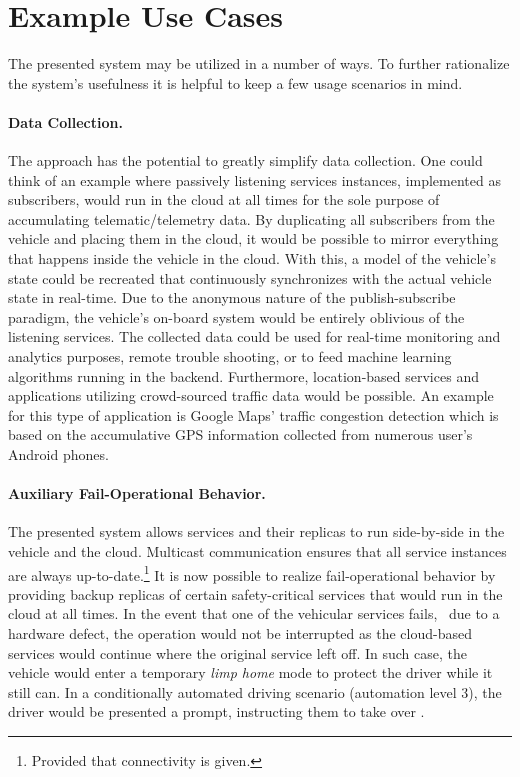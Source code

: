 \section{Example Use Cases} \label{sec:usecases}
The presented system may be utilized in a number of ways. To further rationalize the system's usefulness it is helpful to keep a few usage scenarios in mind.

\paragraph{Data Collection.}
The approach has the potential to greatly simplify data collection. One could think of an example where passively listening services instances, implemented as subscribers, would run in the cloud at all times for the sole purpose of accumulating telematic/telemetry data. By duplicating all subscribers from the vehicle and placing them in the cloud, it would be possible to mirror everything that happens inside the vehicle in the cloud. With this, a model of the vehicle's state could be recreated that continuously synchronizes with the actual vehicle state in real-time. Due to the anonymous nature of the publish-subscribe paradigm, the vehicle's on-board system would be entirely oblivious of the listening services. The collected data could be used for real-time monitoring and analytics purposes, remote trouble shooting, or to feed machine learning algorithms running in the backend. Furthermore, location-based services and applications utilizing crowd-sourced traffic data would be possible. An example for this type of application is Google Maps' traffic congestion detection which is based on the accumulative GPS information collected from numerous user's Android phones.

\paragraph{Auxiliary Fail-Operational Behavior.}
The presented system allows services and their replicas to run side-by-side in the vehicle and the cloud. Multicast communication ensures that all service instances are always up-to-date.\footnote{Provided that connectivity is given.} It is now possible to realize fail-operational behavior by providing backup replicas of certain safety-critical services that would run in the cloud at all times. In the event that one of the vehicular services fails, \eg\ due to a hardware defect, the operation would not be interrupted as the cloud-based services would continue where the original service left off. In such case, the vehicle would enter a temporary \emph{limp home} mode to protect the driver while it still can. In a conditionally automated driving scenario (automation level 3), the driver would be presented a prompt, instructing them to take over \cite{kugele2017service}.

